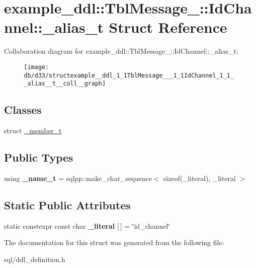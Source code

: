 \hypertarget{structexample__ddl_1_1TblMessage___1_1IdChannel_1_1__alias__t}{}\section{example\+\_\+ddl\+:\+:Tbl\+Message\+\_\+\+:\+:Id\+Channel\+:\+:\+\_\+alias\+\_\+t Struct Reference}
\label{structexample__ddl_1_1TblMessage___1_1IdChannel_1_1__alias__t}


Collaboration diagram for example\+\_\+ddl\+:\+:Tbl\+Message\+\_\+\+:\+:Id\+Channel\+:\+:\+\_\+alias\+\_\+t\+:
\nopagebreak
\begin{figure}[H]
\begin{center}
\leavevmode
\texttt{[image: db/d33/structexample\_\_ddl\_1\_1TblMessage\_\_\_1\_1IdChannel\_1\_1\_\_alias\_\_t\_\_coll\_\_graph]}
\end{center}
\end{figure}
\subsection*{Classes}
\begin{DoxyCompactItemize}
\item 
struct \hyperlink{structexample__ddl_1_1TblMessage___1_1IdChannel_1_1__alias__t_1_1__member__t}{\+\_\+member\+\_\+t}
\end{DoxyCompactItemize}
\subsection*{Public Types}
\begin{DoxyCompactItemize}
\item 
\hypertarget{structexample__ddl_1_1TblMessage___1_1IdChannel_1_1__alias__t_a86b55993a28545d3f3a35068883e25f2}{}using {\bfseries \+\_\+name\+\_\+t} = sqlpp\+::make\+\_\+char\+\_\+sequence$<$ sizeof(\+\_\+literal), \+\_\+literal $>$\label{structexample__ddl_1_1TblMessage___1_1IdChannel_1_1__alias__t_a86b55993a28545d3f3a35068883e25f2}

\end{DoxyCompactItemize}
\subsection*{Static Public Attributes}
\begin{DoxyCompactItemize}
\item 
\hypertarget{structexample__ddl_1_1TblMessage___1_1IdChannel_1_1__alias__t_a23e0ea0c01e166b6e4bbc26c37ee783b}{}static constexpr const char {\bfseries \+\_\+literal} \mbox{[}$\,$\mbox{]} = \char`\"{}id\+\_\+channel\char`\"{}\label{structexample__ddl_1_1TblMessage___1_1IdChannel_1_1__alias__t_a23e0ea0c01e166b6e4bbc26c37ee783b}

\end{DoxyCompactItemize}


The documentation for this struct was generated from the following file\+:\begin{DoxyCompactItemize}
\item 
sql/ddl\+\_\+definition.\+h\end{DoxyCompactItemize}
